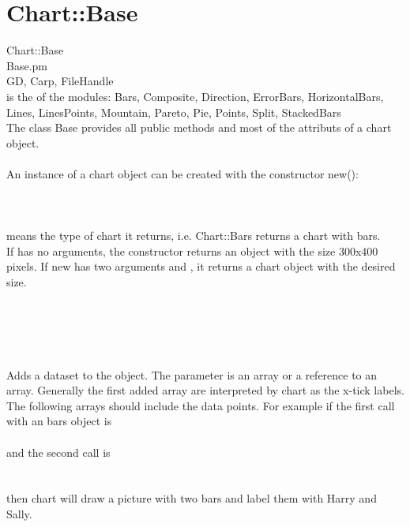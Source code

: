 \section{Chart::Base}
 Chart::Base\\[5mm]
 Base.pm\\[5mm]
GD, Carp, FileHandle\\[5mm]
  is the  of the modules: Bars, Composite, Direction, ErrorBars, HorizontalBars, Lines, LinesPoints, Mountain, Pareto, Pie, Points, Split, StackedBars\\
The class Base provides all public methods and most of the attributs of a chart object.\\
\\
 An instance of a chart object can be created with the constructor new():\\
\\
\\
\\
 means the type of chart it returns, i.e. Chart::Bars returns a chart with bars.\\
If  has no arguments, the constructor returns an object with the size 300x400 pixels. If new has two arguments  and , it returns a chart object with the desired size. \\ 
\\ 
\label{methods}\\
\\
\\ \\
Adds a dataset to the object. The parameter is an array or a reference to an array. Generally the first added array are interpreted by chart as the x-tick labels. The following arrays should include the data points. For example if the first call with an bars object is\\
\\
  and the second call is\\ \\
\\
then chart will draw a picture with two bars and label them with Harry and Sally.\\ \\
